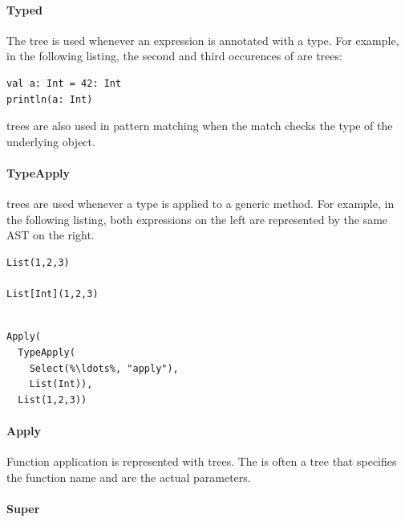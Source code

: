 \paragraph{Typed} 

\noindent The  tree is used whenever an expression is annotated with a type. For example, in the following listing, the second and third occurences of  are  trees:

\begin{lstlisting}
val a: Int = 42: Int
println(a: Int)
\end{lstlisting}

 trees are also used in pattern matching when the match checks the type of the underlying object.

\paragraph{TypeApply} 

\noindent {} trees are used whenever a type is applied to a generic method. For example, in the following listing, both expressions on the left are represented by the same AST on the right.

\begin{multicols}{2}
\begin{lstlisting}
List(1,2,3)

List[Int](1,2,3)


\end{lstlisting}
\begin{lstlisting}
Apply(
  TypeApply(
    Select(%\ldots%, "apply"), 
    List(Int)), 
  List(1,2,3))
\end{lstlisting}
\end{multicols}

\paragraph{Apply} 

\noindent Function application is represented with  trees. The  is often a  tree that specifies the function name and  are the actual parameters.

\paragraph{Super} 


